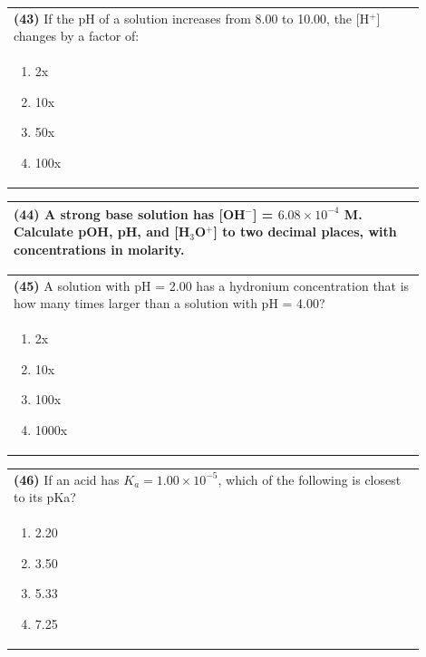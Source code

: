 \documentclass{article}
\begin{document}
\noindent\begin{tabular}{|p{0.9\linewidth}|}
\hline
\textbf{(43)} If the pH of a solution increases from 8.00 to 10.00, the [H$^+$] changes by a factor of: \\[0.2cm]
\begin{minipage}{0.85\linewidth}
\begin{enumerate}[label=\alph*.]
\item 2x \item 10x \item 50x \item 100x
\end{enumerate}
\end{minipage}\\[0.2cm]
\hline
\end{tabular}

\noindent\begin{tabular}{|p{0.9\linewidth}|}
\hline
\textbf{(44)} A strong base solution has [OH$^-$] = $6.08\times10^{-4}$ M. Calculate pOH, pH, and [H$_3$O$^+$] to two decimal places, with concentrations in molarity. \\[4cm]
\hline
\end{tabular}
\newpage

\noindent\begin{tabular}{|p{0.9\linewidth}|}
\hline
\textbf{(45)} A solution with pH = 2.00 has a hydronium concentration that is how many times larger than a solution with pH = 4.00? \\[0.2cm]
\begin{minipage}{0.85\linewidth}
\begin{enumerate}[label=\alph*.]
\item 2x \item 10x \item 100x \item 1000x
\end{enumerate}
\end{minipage}\\[0.2cm]
\hline
\end{tabular}

\noindent\begin{tabular}{|p{0.9\linewidth}|}
\hline
\textbf{(46)} If an acid has $K_a = 1.00\times10^{-5}$, which of the following is closest to its pKa? \\[0.2cm]
\begin{minipage}{0.85\linewidth}
\begin{enumerate}[label=\alph*.]
\item 2.20 \item 3.50 \item 5.33 \item 7.25
\end{enumerate}
\end{minipage}\\[0.2cm]
\hline
\end{tabular}
\end{document}
